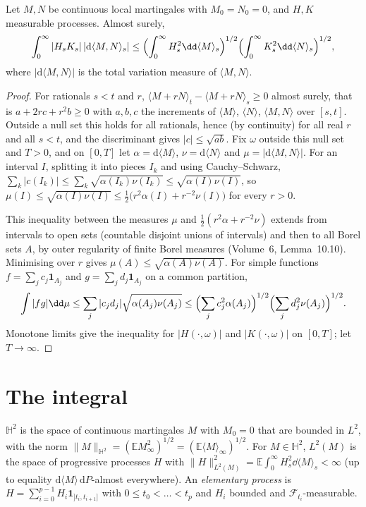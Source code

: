 \begin{lemma}\label{lem:kw}
Let $M,N$ be continuous local martingales with $M_0=N_0=0$, and $H,K$ measurable processes. Almost surely,
\[
\int_0^\infty|H_sK_s|\,|\mathrm d\langle M,N\rangle_s|\le\Bigl(\int_0^\infty H_s^2\dd\langle M\rangle_s\Bigr)^{1/2}\Bigl(\int_0^\infty K_s^2\dd\langle N\rangle_s\Bigr)^{1/2},
\]
where $|\mathrm d\langle M,N\rangle|$ is the total variation measure of $\langle M,N\rangle$.
\end{lemma}

\begin{proof}
For rationals $s<t$ and $r$, $\langle M+rN\rangle_t-\langle M+rN\rangle_s\ge0$ almost surely, that is $a+2rc+r^2b\ge0$ with $a,b,c$ the increments of $\langle M\rangle$, $\langle N\rangle$, $\langle M,N\rangle$ over $[s,t]$.
Outside a null set this holds for all rationals, hence (by continuity) for all real $r$ and all $s<t$, and the discriminant gives $|c|\le\sqrt{ab}$. Fix $\omega$ outside this null set and $T>0$, and on $[0,T]$ let
$\alpha=\mathrm d\langle M\rangle$, $\nu=\mathrm d\langle N\rangle$ and $\mu=|\mathrm d\langle M,N\rangle|$. For an interval $I$, splitting it into pieces $I_k$ and using Cauchy--Schwarz,
$\sum_k|c(I_k)|\le\sum_k\sqrt{\alpha(I_k)\nu(I_k)}\le\sqrt{\alpha(I)\nu(I)}$, so $\mu(I)\le\sqrt{\alpha(I)\nu(I)}\le\frac12\bigl(r^2\alpha(I)+r^{-2}\nu(I)\bigr)$ for every $r>0$.

This inequality between the measures $\mu$ and $\frac12(r^2\alpha+r^{-2}\nu)$ extends from intervals to open sets (countable disjoint unions of intervals) and then to all Borel sets $A$, by outer regularity of finite
Borel measures (Volume~6, Lemma~10.10). Minimising over $r$ gives $\mu(A)\le\sqrt{\alpha(A)\nu(A)}$. For simple functions $f=\sum_jc_j\mathbf 1_{A_j}$ and $g=\sum_jd_j\mathbf 1_{A_j}$ on a common partition,
\[
\int|fg|\dd\mu\le\sum_j|c_jd_j|\sqrt{\alpha(A_j)\nu(A_j)}\le\Bigl(\sum_jc_j^2\alpha(A_j)\Bigr)^{1/2}\Bigl(\sum_jd_j^2\nu(A_j)\Bigr)^{1/2}.
\]
Monotone limits give the inequality for $|H(\cdot,\omega)|$ and $|K(\cdot,\omega)|$ on $[0,T]$; let $T\to\infty$.
\end{proof}

\section{The integral}

\begin{definition}\label{def:H2}
$\mathbb H^2$ is the space of continuous martingales $M$ with $M_0=0$ that are bounded in $L^2$, with the norm $\|M\|_{\mathbb H^2}=(\mathbb EM_\infty^2)^{1/2}=(\mathbb E\langle M\rangle_\infty)^{1/2}$. For $M\in\mathbb H^2$,
$L^2(M)$ is the space of progressive processes $H$ with $\|H\|^2_{L^2(M)}=\mathbb E\int_0^\infty H_s^2\dd\langle M\rangle_s<\infty$ (up to equality $\mathrm d\langle M\rangle\,\mathrm dP$-almost everywhere). An \emph{elementary process}
is $H=\sum_{i=0}^{p-1}H_i\mathbf 1_{]t_i,t_{i+1}]}$ with $0\le t_0<\dots<t_p$ and $H_i$ bounded and $\mathcal F_{t_i}$-measurable.
\end{definition}

